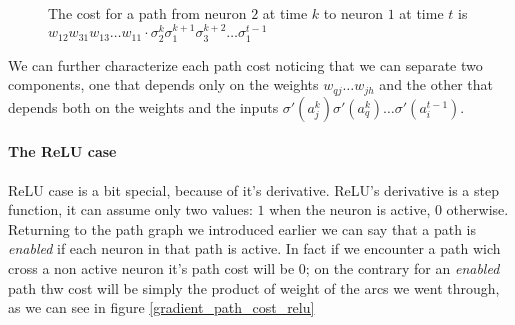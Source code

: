 \begin{figure}
\caption{The cost for a path from neuron $2$ at time $k$ to neuron $1$ at time $t$ is $w_{12}w_{31}w_{13}\hdots w_{11}\cdot \sigma_2^k \sigma_1^{k+1}\sigma_3^{k+2} \hdots \sigma_1^{t-1} $ }
\label{gradient_path_cost}
\end{figure}


We can further characterize each path cost noticing that we can separate two components, one that depends only on the weights $w_{qj} \hdots w_{jh}$ and the other that depends both on the weights and the inputs
$\sigma'(a_j^k)\sigma'(a_q^{k}) \hdots \sigma'(a_i^{t-1})$.


\paragraph{The ReLU case}
ReLU case is a bit special, because of it's derivative.
ReLU's derivative is a step function, it can assume only two values: $1$ when the neuron is active, $0$ otherwise.
Returning to the path graph we introduced earlier we can say that a path is \textit{enabled} if each neuron in that path is active. In fact if we
encounter a path wich cross a non active neuron it's path cost will be 0; on the contrary for an \textit{enabled} path thw cost will be simply the product
of weight of the arcs we went through, as we can see in figure \ref{gradient_path_cost_relu}


